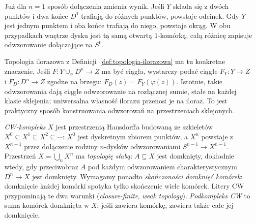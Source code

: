 Już dla $n=1$ sposób dołączenia zmienia wynik. Jeśli
$Y$ składa się z dwóch punktów i dwa końce $D^1$ trafiają
do różnych punktów, powstaje odcinek. Gdy $Y$ jest jednym
punktem i oba końce trafiają do niego, powstaje okrąg.
W obu przypadkach wnętrze dysku jest tą samą otwartą
$1$-komórką; całą różnicę zapisuje odwzorowanie
dołączające na $S^0$.

Topologia ilorazowa z
Definicji~\ref{def:topologia-ilorazowa}
ma tu konkretne znaczenie. Jeśli
$F:Y\cup_\varphi D^n\to Z$
ma być ciągła, wystarczy podać
ciągłe $F_Y:Y\to Z$ i
$F_D:D^n\to Z$ zgodne na brzegu:
$F_D(z)=F_Y(\varphi(z))$.
Istotnie, takie odwzorowania dają ciągłe
odwzorowanie na rozłącznej sumie, stałe
na każdej klasie sklejenia;
uniwersalna własność ilorazu
przenosi je na iloraz.
To jest praktyczny sposób
konstruowania odwzorowań na przestrzeniach
sklejonych.

\begin{definicja}[CW-kompleks]
\label{def:cw-kompleks}
\emph{CW-kompleks} $X$ jest przestrzenią Hausdorffa budowaną
ze szkieletów $X^0\subseteq X^1
\subseteq X^2\subseteq\cdots$:
$X^0$ jest dyskretnym zbiorem punktów,
a $X^n$ powstaje z $X^{n-1}$
przez dołączenie rodziny $n$-dysków
odwzorowaniami $S^{n-1}\to X^{n-1}$.
Przestrzeń $X=\bigcup_n X^n$
ma \emph{topologię słabą}:
$A\subseteq X$ jest domknięty,
dokładnie wtedy, gdy przeciwobraz $A$ pod każdym
odwzorowaniem charakterystycznym $D^n\to X$
jest domknięty. Wymagamy ponadto
\emph{skończoności domknięć komórek}:
domknięcie każdej komórki
spotyka tylko skończenie wiele
komórek. Litery CW przypominają
te dwa warunki
(\emph{closure-finite}, \emph{weak topology}).
\emph{Podkompleks CW} to suma komórek
domknięta w $X$; jeśli zawiera komórkę,
zawiera także całe jej domknięcie.
\end{definicja}

